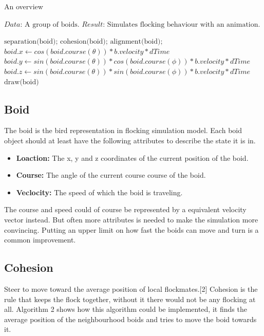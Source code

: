 \documentclass{article}
\begin{document}
\begin{algorithm}
\caption{An overview}\label{euclid}
\begin{algorithmic}[1]
\State $\textit{Data:   } \text{A group of boids.}$
\State $\textit{Result:   } \text{Simulates flocking behaviour with an animation.}$

    \State $\text{separation(boid);} $
    \State $\text{cohesion(boid);} $
    \State $\text{alignment(boid);} $
    \EndFor
    \State $boid.x \gets cos(boid.course(\theta)) * b.velocity * dTime $
    \State $boid.y \gets sin(boid.course(\theta)) * cos(boid.course(\phi)) * b.velocity * dTime $
    \State $boid.z \gets sin(boid.course(\theta)) * sin(boid.course(\phi)) * b.velocity * dTime $
    \State $\text{draw(boid)} $
    \EndFor
\Endfor

\end{algorithmic}

\end{algorithm}

\subsection{Boid}
The boid is the bird representation in flocking simulation model. Each boid object should at least have the following attributes to describe the state it is in.

\begin{itemize}
    \item \textbf{Loaction: } The x, y and z coordinates of the current position of the boid.
    \item \textbf{Course: } The angle of the current course course of the boid.
    \item \textbf{Veclocity: } The speed of which the boid is traveling.
\end{itemize}
\bigbreak
The course and speed could of course be represented by a equivalent velocity vector instead. But often more attributes is needed to make the simulation more convincing. Putting an upper limit on how fast the boids can move and turn is a common improvement.

\subsection{Cohesion}

Steer to move toward the average position of local flockmates.[2] Cohesion is the rule that keeps the flock together, without it there would not be any flocking at all. Algorithm 2 shows how this algorithm could be implemented, it finds the average position of the neighbourhood boids and tries to move the boid towards it.
\end{document}
